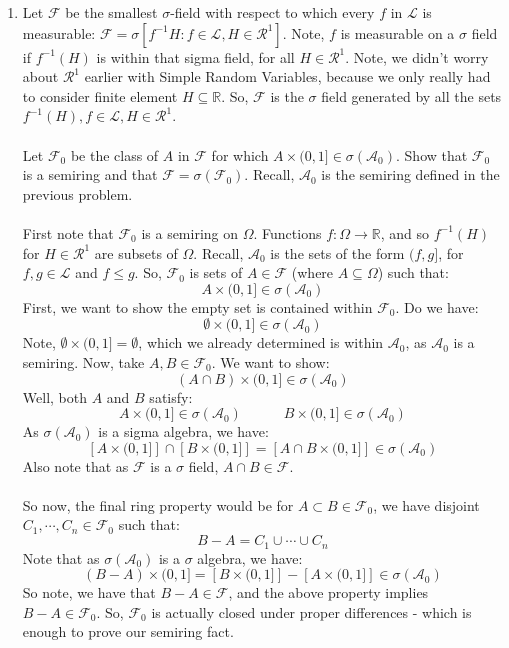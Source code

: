 \documentclass[12pt,a4paper]{article}
\newcommand{\1}[1]{\mathbbm{1}\left\{ #1 \right\}}
\newcommand{\R}{\mathbb{R}}
\newcommand{\acal}{\mathcal{A}}
\newcommand{\lcal}{\mathcal{L}}
\newcommand{\fcal}{\mathcal{F}}
\newcommand{\rcal}{\mathcal{R}}
\begin{document}
\begin{enumerate}
	\item Let $\fcal$ be the smallest $\sigma$-field with respect to which every $f$ in $\lcal$ is measurable: $\fcal = \sigma\left[f^{-1}H : f \in \lcal, H \in \rcal^1\right]$. Note, $f$ is measurable on a $\sigma$ field if $f^{-1}(H)$ is within that sigma field, for all $H \in \rcal^1$. Note, we didn't worry about $\rcal^1$ earlier with Simple Random Variables, because we only really had to consider finite element $H \subseteq \R$. So, $\fcal$ is the $\sigma$ field generated by all the sets $f^{-1}(H), f \in \lcal, H \in \rcal^1$.
	\\\\
	Let $\fcal_0$ be the class of $A$ in $\fcal$ for which $A \times (0,1] \in \sigma(\acal_0)$. Show that $\fcal_0$ is a semiring and that $\fcal = \sigma(\fcal_0)$. Recall, $\acal_0$ is the semiring defined in the previous problem.
	\\\\
	First note that $\fcal_0$ is a semiring on $\Omega$. Functions $f: \Omega \to \R$, and so $f^{-1}(H)$ for $H \in \rcal^1$ are subsets of $\Omega$. Recall, $\acal_0$ is the sets of the form $(f,g]$, for $f,g \in \lcal$ and $f \leq g$. So, $\fcal_0$ is sets of $A \in \fcal$ (where $A \subseteq \Omega$) such that:
	$$
		A \times (0,1] \in \sigma(\acal_0)
	$$
	First, we want to show the empty set is contained within $\fcal_0$. Do we have:
	$$
		\emptyset \times (0,1] \in \sigma(\acal_0)
	$$
	Note, $\emptyset \times (0,1] = \emptyset$, which we already determined is within $\acal_0$, as $\acal_0$ is a semiring. Now, take $A, B \in \fcal_0$. We want to show:
	$$
		(A \cap B) \times (0,1] \in \sigma(\acal_0)
	$$
	Well, both $A$ and $B$ satisfy:
	$$
		A \times (0,1] \in \sigma(\acal_0) \quad\quad\quad
		B \times (0,1] \in \sigma(\acal_0)
	$$
	As $\sigma(\acal_0)$ is a sigma algebra, we have:
	$$
		\left[A \times (0,1]\right] \cap \left[B \times (0,1]\right] =
		\left[A \cap B \times (0,1]\right] \in \sigma(\acal_0)
	$$
	Also note that as $\fcal$ is a $\sigma$ field, $A \cap B \in \fcal$.
	\\\\
	So now, the final ring property would be for $A \subset B \in \fcal_0$, we have disjoint $C_1, \cdots, C_n \in \fcal_0$ such that:
	$$
		B - A = C_1 \cup \cdots \cup C_n
	$$
	Note that as $\sigma(\acal_0)$ is a $\sigma$ algebra, we have:
	$$
		(B - A) \times (0,1] =
		\left[B \times (0,1]\right] - \left[A \times (0,1]\right] \in \sigma(\acal_0)
	$$
	So note, we have that $B - A \in \fcal$, and the above property implies $B - A \in \fcal_0$. So, $\fcal_0$ is actually closed under proper differences - which is enough to prove our semiring fact.

\end{enumerate}
\end{document}
